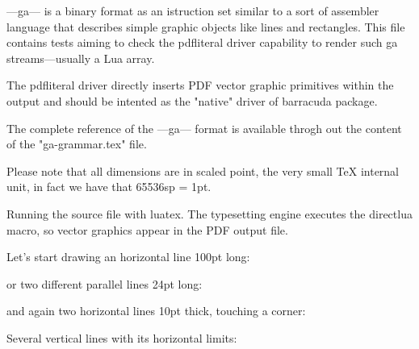 %

---ga--- is a binary format as an istruction set similar to
a sort of assembler language that describes simple graphic
objects like lines and rectangles.
This file contains tests aiming to check the pdfliteral
driver capability to render such ga streams---usually a Lua
array.

The pdfliteral driver directly inserts PDF vector graphic
primitives within the output and should be intented as the
"native" driver of barracuda package.

The complete reference of the ---ga--- format is available
throgh out the content of the "ga-grammar.tex" file.

Please note that all dimensions are in scaled point, the
very small \TeX{} internal unit, in fact we have that
65536sp = 1pt.

Running the source file with luatex. The typesetting engine
executes the directlua macro, so vector graphics appear in
the PDF output file.

\newbox\mybox
{}

Let's start drawing an horizontal line 100pt long:
\box\mybox

or two different parallel lines 24pt long:
\box\mybox

and again two horizontal lines 10pt thick, touching a corner:
\box\mybox

Several vertical lines with its horizontal limits:
\box\mybox

